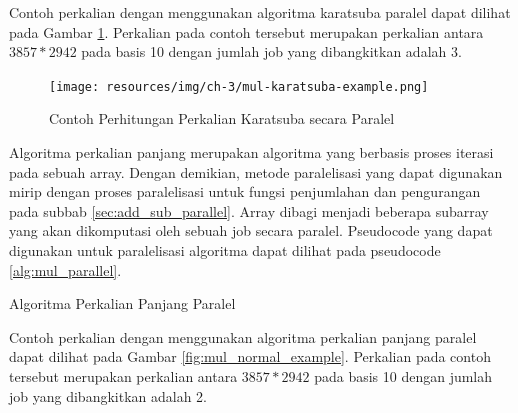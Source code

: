      Contoh perkalian dengan menggunakan algoritma karatsuba paralel dapat dilihat pada Gambar \ref{fig:mul_karatsuba_example}. Perkalian pada contoh tersebut merupakan perkalian antara $3857*2942$ pada basis 10 dengan jumlah job yang dibangkitkan adalah 3.

      \begin{figure}
          \centering
          \texttt{[image: resources/img/ch-3/mul-karatsuba-example.png]}
          \caption{Contoh Perhitungan Perkalian Karatsuba secara Paralel}
          \label{fig:mul_karatsuba_example}
      \end{figure}

      Algoritma perkalian panjang merupakan algoritma yang berbasis proses iterasi pada sebuah array. Dengan demikian, metode paralelisasi yang dapat digunakan mirip dengan proses paralelisasi untuk fungsi penjumlahan dan pengurangan pada subbab \ref{sec:add_sub_parallel}. Array dibagi menjadi beberapa subarray yang akan dikomputasi oleh sebuah job secara paralel. Pseudocode yang dapat digunakan untuk paralelisasi algoritma dapat dilihat pada pseudocode \ref{alg:mul_parallel}.

      \begin{algorithm}
        \caption{Algoritma Perkalian Panjang Paralel}
        \label{alg:mul_parallel}
        \begin{algorithmic}[1]
          \Statex
          \State {}
          \EndFor
          \EndFor
          \State {}
          \EndFunction
        \end{algorithmic}
      \end{algorithm}

        Contoh perkalian dengan menggunakan algoritma perkalian panjang paralel dapat dilihat pada Gambar \ref{fig:mul_normal_example}. Perkalian pada contoh tersebut merupakan perkalian antara $3857*2942$ pada basis 10 dengan jumlah job yang dibangkitkan adalah 2.

